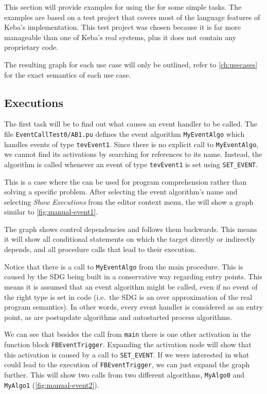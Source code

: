 This section will provide examples for using the \SB for some simple tasks. The examples are based on a test project 
that covers most of the language features of Keba's \IEC implementation. This test project was chosen because it is far 
more manageable than one of Keba's real systems, plus it does not contain any proprietary code.

The resulting graph for each use case will only be outlined, refer to \autoref{ch:usecases} for the exact semantics of 
each use case.

\subsection*{Executions}

The first task will be to find out what causes an event handler to be called. The file \texttt{EventCallTest0/AB1.pu} 
defines the event algorithm \lstinline|MyEventAlgo| which handles events of type \lstinline|tevEvent1|. Since there is 
no explicit call to \lstinline|MyEventAlgo|, we cannot find its activations by searching for references to its name. 
Instead, the algorithm is called whenever an event of type \lstinline|tevEvent1| is set using \lstinline|SET_EVENT|.

This is a case where the \SB can be used for program comprehension rather than solving a specific problem. After 
selecting the event algorithm's name and selecting \emph{Show Executions} from the editor context menu, the \SB will 
show a graph similar to \autoref{fig:manual-event1}.

The graph shows control dependencies and follows them backwards. This means it will show all conditional statements on 
which the target directly or indirectly depends, and all procedure calls that lead to their execution.

Notice that there is a call to \lstinline|MyEventAlgo| from the main procedure. This is caused by the SDG being built 
in a conservative way regarding entry points. This means it is assumed that an event algorithm might be called, even if 
no event of the right type is set in code (i.e.\ the SDG is an over approximation of the real program semantics). In 
other words, every event handler is considered as an entry point, as are postupdate algorithms and autostarted process 
algorithms.

We can see that besides the call from \lstinline|main| there is one other activation in the function block 
\lstinline|FBEventTrigger|. Expanding the activation node will show that this activation is caused by a call to 
\lstinline|SET_EVENT|. If we were interested in what could lead to the execution of \lstinline|FBEventTrigger|, we can 
just expand the graph further. This will show two calls from two different algorithms, \lstinline|MyAlgo0| and 
\lstinline|MyAlgo1| (\autoref{fig:manual-event2}).

